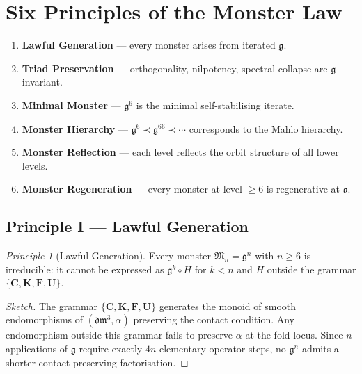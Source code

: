 \documentclass[12pt,a4paper]{amsart}
\theoremstyle{definition}
\theoremstyle{remark}
\newtheorem{principle}{Principle}
\newcommand{\Cop}{\mathbf{C}}
\newcommand{\Kop}{\mathbf{K}}
\newcommand{\Fop}{\mathbf{F}}
\newcommand{\Uop}{\mathbf{U}}
\newcommand{\GG}{\mathfrak{g}}
\newcommand{\MM}{\mathfrak{M}}
\newcommand{\dm}{\mathfrak{dm}^3}
\newcommand{\ocio}{\mathfrak{o}}
\begin{document}
\section{Six Principles of the Monster Law}\label{sec:sixprinciples}

\begin{tcolorbox}[principleBox,title=The Six Principles]
\begin{enumerate}
  \item \textbf{Lawful Generation} --- every monster arises from iterated $\GG$.
  \item \textbf{Triad Preservation} --- orthogonality, nilpotency, spectral collapse are $\GG$-invariant.
  \item \textbf{Minimal Monster} --- $\GG^6$ is the minimal self-stabilising iterate.
  \item \textbf{Monster Hierarchy} --- $\GG^6 \prec \GG^{66} \prec \cdots$ corresponds to the Mahlo hierarchy.
  \item \textbf{Monster Reflection} --- each level reflects the orbit structure of all lower levels.
  \item \textbf{Monster Regeneration} --- every monster at level $\geq 6$ is regenerative at $\ocio$.
\end{enumerate}
\end{tcolorbox}

\subsection{Principle I --- Lawful Generation}

\begin{principle}[Lawful Generation]\label{prin:lawful}
Every monster $\MM_n = \GG^n$ with $n \geq 6$ is irreducible: it cannot be expressed
as $\GG^k \circ H$ for $k < n$ and $H$ outside the grammar $\{\Cop,\Kop,\Fop,\Uop\}$.
\end{principle}

\begin{proof}[Sketch]
The grammar $\{\Cop,\Kop,\Fop,\Uop\}$ generates the monoid of smooth endomorphisms
of $(\dm,\alpha)$ preserving the contact condition. Any endomorphism outside this
grammar fails to preserve $\alpha$ at the fold locus. Since $n$ applications of $\GG$
require exactly $4n$ elementary operator steps, no $\GG^n$ admits a shorter
contact-preserving factorisation.
\end{proof}
\end{document}
